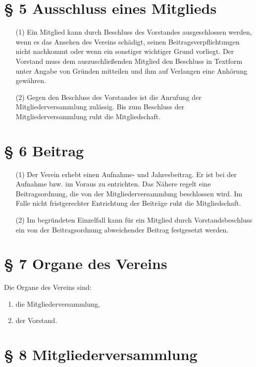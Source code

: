 \documentclass[12pt,paper=a4,ngerman]{scrreprt}
\begin{document}
\section{\S{} 5 Ausschluss eines Mitglieds}

\begin{itemize}
\item[(1)]
Ein Mitglied kann durch Beschluss des Vorstandes ausgeschlossen
werden, wenn es das Ansehen des Vereins schädigt, seinen
Beitragsverpflichtungen nicht nachkommt oder wenn ein sonstiger
wichtiger Grund vorliegt. Der Vorstand muss dem auszuschließenden
Mitglied den Beschluss in Textform unter Angabe von Gründen mitteilen
und ihm auf Verlangen eine Anhörung gewähren.
\item[(2)]
Gegen den Beschluss des Vorstandes ist die Anrufung der
Mitgliederversammlung zulässig. Bis zum Beschluss der
Mitgliederversammlung ruht die Mitgliedschaft.
\end{itemize}

\section{\S{} 6 Beitrag}

\begin{itemize}
\item[(1)]
Der Verein erhebt einen Aufnahme- und Jahresbeitrag. Er ist bei der
Aufnahme bzw. im Voraus zu entrichten. Das Nähere regelt eine
Beitragsordnung, die von der Mitgliederversammlung beschlossen wird.
Im Falle nicht fristgerechter Entrichtung der Beiträge ruht die
Mitgliedschaft.
\item[(2)]
Im begründeten Einzelfall kann für ein Mitglied durch
Vorstandsbeschluss ein von der Beitragsordnung abweichender Beitrag
festgesetzt werden.
\end{itemize}

\section{\S{} 7 Organe des Vereins}

Die Organe des Vereins sind:
\begin{enumerate}
\item
die Mitgliederversammlung,
\item
der Vorstand.
\end{enumerate}

\section{\S{} 8 Mitgliederversammlung}
\end{document}
